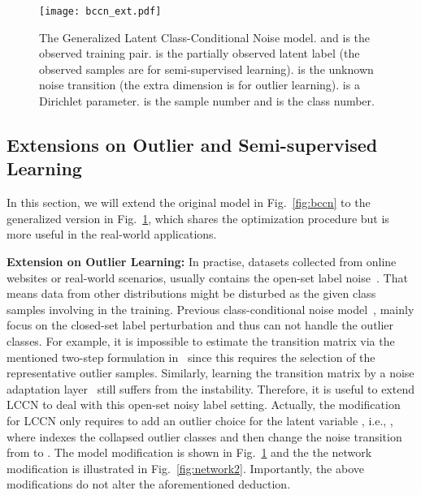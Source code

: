 \documentclass[journal]{IEEEtran}
\begin{document}
\begin{figure} 
\centering
\texttt{[image: bccn\_ext.pdf]}
\caption{The Generalized Latent Class-Conditional Noise model.  and  is the observed training pair.  is the partially observed latent label (the observed samples are for semi-supervised learning).  is the unknown noise transition (the extra dimension is for outlier learning).  is a Dirichlet parameter.  is the sample number and  is the class number.}\label{fig:outlier_semi}
\end{figure}

\subsection{Extensions on Outlier and Semi-supervised Learning}
In this section, we will extend the original model in Fig.~\ref{fig:bccn} to the generalized version in Fig.~\ref{fig:outlier_semi}, which shares the optimization procedure but is more useful in the real-world applications. 

\textbf{Extension on Outlier Learning:} 
In practise, datasets collected from online websites or real-world scenarios, usually contains the open-set label noise~\cite{wang2018iterative}. That means data from other distributions might be disturbed as the given class samples involving in the training. Previous class-conditional noise model~\cite{reed2014training,xiao2015learning,sukhbaatar2014training,patrini2017making,goldberger2016training}, mainly focus on the closed-set label perturbation and thus can not handle the outlier classes. For example, it is impossible to estimate the transition matrix via the mentioned two-step formulation in~\cite{patrini2017making} since this requires the selection of the representative outlier samples. Similarly, learning the transition matrix by a noise adaptation layer~\cite{goldberger2016training} still suffers from the instability. Therefore, it is useful to extend LCCN to deal with this open-set noisy label setting. Actually, the modification for LCCN only requires to add an outlier choice for the latent variable , i.e., , where  indexes the collapsed outlier classes and then change the noise transition from  to . The model modification is shown in Fig.~\ref{fig:outlier_semi} and the the network modification is illustrated in Fig.~\ref{fig:network2}. Importantly, the above modifications do not alter the aforementioned deduction.
\end{document}
